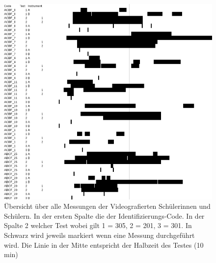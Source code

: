   
  
   \begin{figure}[htp]
   \centering
   \includegraphics[width=1.0\linewidth]{graphics/Messungen2.png}
   \caption{Übersicht über alle Messungen der Videografierten Schülerinnen und Schülern. In der ersten Spalte die der Identifizierungs-Code. In der Spalte 2 welcher Test wobei gilt 1 = 305, 2 = 201, 3 = 301. In Schwarz wird jeweils markiert wenn eine Messung durchgeführt wird. Die Linie in der Mitte entspricht der Halbzeit des Testes (10 min)}
   \label{fig:Messungen}
   \end{figure}
   
  
